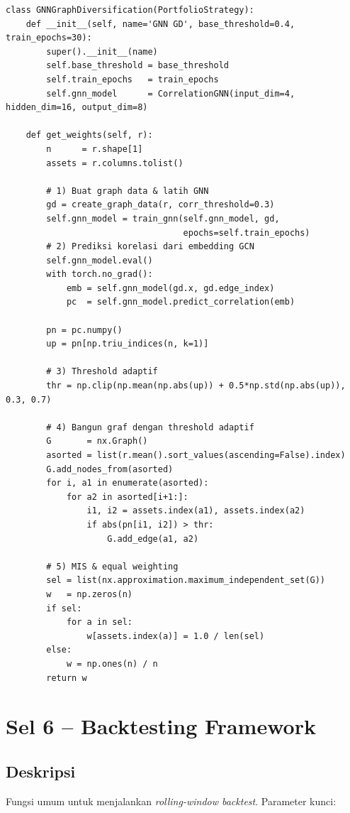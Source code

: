 \documentclass[12pt,a4paper]{article}
\begin{document}
\begin{lstlisting}[caption={GNNGraphDiversification}]
class GNNGraphDiversification(PortfolioStrategy):
    def __init__(self, name='GNN GD', base_threshold=0.4, train_epochs=30):
        super().__init__(name)
        self.base_threshold = base_threshold
        self.train_epochs   = train_epochs
        self.gnn_model      = CorrelationGNN(input_dim=4, hidden_dim=16, output_dim=8)

    def get_weights(self, r):
        n      = r.shape[1]
        assets = r.columns.tolist()

        # 1) Buat graph data & latih GNN
        gd = create_graph_data(r, corr_threshold=0.3)
        self.gnn_model = train_gnn(self.gnn_model, gd,
                                   epochs=self.train_epochs)
        # 2) Prediksi korelasi dari embedding GCN
        self.gnn_model.eval()
        with torch.no_grad():
            emb = self.gnn_model(gd.x, gd.edge_index)
            pc  = self.gnn_model.predict_correlation(emb)

        pn = pc.numpy()
        up = pn[np.triu_indices(n, k=1)]

        # 3) Threshold adaptif
        thr = np.clip(np.mean(np.abs(up)) + 0.5*np.std(np.abs(up)), 0.3, 0.7)

        # 4) Bangun graf dengan threshold adaptif
        G       = nx.Graph()
        asorted = list(r.mean().sort_values(ascending=False).index)
        G.add_nodes_from(asorted)
        for i, a1 in enumerate(asorted):
            for a2 in asorted[i+1:]:
                i1, i2 = assets.index(a1), assets.index(a2)
                if abs(pn[i1, i2]) > thr:
                    G.add_edge(a1, a2)

        # 5) MIS & equal weighting
        sel = list(nx.approximation.maximum_independent_set(G))
        w   = np.zeros(n)
        if sel:
            for a in sel:
                w[assets.index(a)] = 1.0 / len(sel)
        else:
            w = np.ones(n) / n
        return w
\end{lstlisting}

\section{Sel 6 -- Backtesting Framework}

\subsection{Deskripsi}
Fungsi umum untuk menjalankan \textit{rolling-window backtest}. Parameter kunci:
\end{document}
